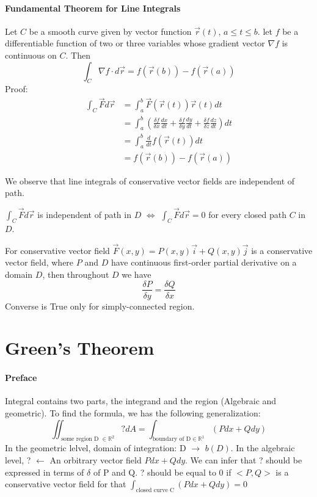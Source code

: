 \documentclass[11pt, oneside]{article}   	%
\begin{document}
\paragraph{Fundamental Theorem for Line Integrals}
Let $C$ be a smooth curve given by vector function $\vec{r}(t)$, $a\leq t \leq b$. let $f$ be a differentiable function of two or three variables whose gradient vector $\nabla f$ is continuous on $C$. Then
$$\int_C \nabla f \cdot d\vec{r}=f(\vec{r}(b))-f(\vec{r}(a))$$
Proof:
\begin{align*}
\int_C\vec{F}d\vec{r} & = \int_a^b\vec{F}(\vec{r}(t))\vec{r}(t)dt \\
& = \int_a^b (\frac{\delta f}{\delta x}\frac{dx}{dt}+\frac{\delta f}{\delta y}\frac{dy}{dt}+\frac{\delta f}{\delta z}\frac{dz}{dt})dt \\
& = \int_a^b \frac{d}{dt} f(\vec{r}(t)) dt \\
& = f(\vec{r}(b))-f(\vec{r}(a))
\end{align*}
\par
We observe that line integrals of conservative vector fields are independent of path.
\par
$\int_C\vec{F}d\vec{r}$ is independent of path in $D$ $\iff$ $\int_C\vec{F}d\vec{r} =0$ for every closed path $C$ in $D$.
\par
For conservative vector field $\vec{F}(x,y) = P(x,y)\vec{i} +Q(x,y)\vec{j}$ is a conservative vector field, where $P$ and $D$ have continuous first-order partial derivative on a domain $D$, then throughout $D$ we have
$$\frac{\delta P}{\delta y} = \frac{\delta Q}{\delta x}$$ Converse is True only for simply-connected region. 


\section{Green's Theorem}
\paragraph{Preface}
Integral contains two parts, the integrand and the region (Algebraic and geometric). To find the formula, we has the following generalization: $$\iint_{\text{ some region D } \in \mathbb{R}^2} ? dA = \int_{\text{boundary of D} \in \mathbb{R}^1} (Pdx + Qdy)$$
In the geometric lelvel, domain of integration: D $\to$ $b(D)$. In the algebraic level, ? $\leftarrow$ An orbitrary vector field $Pdx + Qdy$. We can infer that ? should be expressed in terms of $\delta$ of P and Q. ? should be equal to 0 if $<P,Q>$ is a conservative vector field for that $\int_{\text{closed curve C}} (Pdx + Qdy) = 0$
\end{document}
